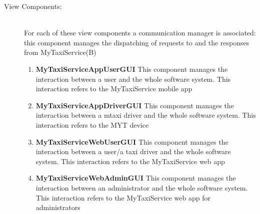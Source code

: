 \documentclass[11pt,titlepage]{article} %
\begin{document}
\begin{description}
	      \item [View Components:] \hfill \\
		For each of these view components a communication manager is associated: this component manages the dispatching of requests to and the responses from MyTaxiService(B)
		\begin{enumerate}
		        \item \textbf{MyTaxiServiceAppUserGUI}
		            \newline This component manages the interaction between a user and the whole software system. This interaction refers to the
		            MyTaxiService mobile app
		        \item \textbf{MyTaxiServiceAppDriverGUI}
		            \newline This component manages the interaction between a mtaxi driver and the whole software system. This interaction refers to
		            the MYT device
		        \item \textbf{MyTaxiServiceWebUserGUI}
		          \newline This component manages the interaction between a user/a taxi driver and the whole software system. This interaction refers to
		          the MyTaxiService web app
		        \item \textbf{MyTaxiServiceWebAdminGUI}
		          \newline This component manages the interaction between an administrator and the whole software system. This interaction refers to
		          the MyTaxiService web app for administrators
		\end{enumerate}
	\end{description}
\newpage
\end{document}
